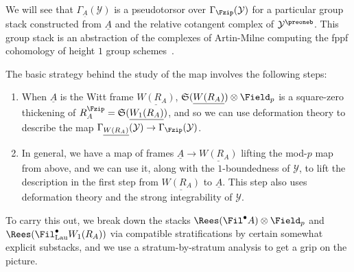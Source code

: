 \documentclass[10pt]{amsart}
\begin{document}
\begin{remark}
We will see that $\Gamma_{\underline{A}}(\mathcal{Y})$ is a pseudotorsor over $\Gamma_{\Fzip}(\mathcal{Y})$ for a particular group stack constructed from $\underline{A}$ and the relative cotangent complex of $\mathcal{Y}^\preoneb$. This group stack is an abstraction of the complexes of Artin-Milne computing the fppf cohomology of height $1$ group schemes~\cite{artin_milne}. 

The basic strategy behind the study of the map involves the following steps:
\begin{enumerate} 
   \item When $\underline{A}$ is the Witt frame $\underline{W(R_A)}$, $\mathfrak{S}(\underline{W(R_A)})\otimes\Field_p$ is a square-zero thickening of $R_A^{\Fzip} = \mathfrak{S}(\underline{W_1(R_A)})$, and so we can use deformation theory to describe the map $\Gamma_{\underline{W(R_A)}}(\mathcal{Y})\to \Gamma_{\Fzip}(\mathcal{Y})$.
   \item In general, we have a map of frames $\underline{A}\to \underline{W(R_A)}$ lifting the mod-$p$ map from above, and we can use it, along with the $1$-boundedness of $\mathcal{Y}$, to lift the description in the first step from $\underline{W(R_A)}$ to $\underline{A}$. This step also uses deformation theory and the strong integrability of $\mathcal{Y}$.
\end{enumerate}
To carry this out, we break down the stacks $\Rees(\Fil^\bullet A)\otimes\Field_p$ and $\Rees(\Fil^\bullet_{\mathrm{Lau}}W_1(R_A))$ via compatible stratifications by certain somewhat explicit substacks, and we use a stratum-by-stratum analysis to get a grip on the picture.
\end{remark}
\end{document}
